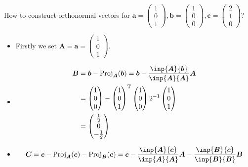 \begin{example}
How to construct orthonormal vectors for $\bm a=\begin{pmatrix}
1\\0\\1
\end{pmatrix},\bm b=\begin{pmatrix}
1\\0\\0
\end{pmatrix},\bm c=\begin{pmatrix}
2\\1\\0
\end{pmatrix}?$\\
\begin{itemize}
\item
Firstly we set $\bm A=\bm a=\begin{pmatrix}
1\\0\\1
\end{pmatrix}$.
\item
\[
\begin{aligned}
\bm B&=\bm b-\Proj_{\bm A}(\bm b)=\bm b-\frac{\inp{\bm A}{\bm b}}{\inp{\bm A}{\bm A}}\bm A\\
&=\begin{pmatrix}
1\\0\\0
\end{pmatrix}-\begin{pmatrix}
1\\0\\1
\end{pmatrix}\trans\begin{pmatrix}
1\\0\\0
\end{pmatrix}2^{-1}\begin{pmatrix}
1\\0\\1
\end{pmatrix}\\
&=\begin{pmatrix}
\frac{1}{2}\\0\\-\frac{1}{2}
\end{pmatrix}
\end{aligned}
\]
\item
\[
\begin{aligned}
\bm C&=\bm c-\Proj_{\bm A}(\bm c)-\Proj_{\bm B}(\bm c)=\bm c-\frac{\inp{\bm A}{\bm c}}{\inp{\bm A}{\bm A}}\bm A-\frac{\inp{\bm B}{\bm c}}{\inp{\bm B}{\bm B}}\bm B\\

\end{aligned}\]
\end{itemize}
\end{example}
